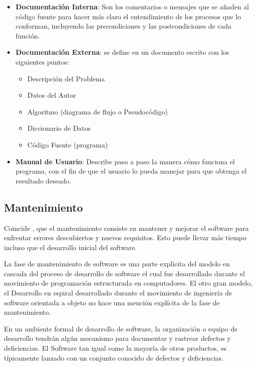 \documentclass[12pt]{article}
\begin{document}
	\begin{itemize}[label=\textbullet, leftmargin=1.27cm]
		\item \textbf{Documentación Interna}: Son los comentarios o mensajes que se añaden al código fuente para hacer más claro el entendimiento de los procesos que lo conforman, incluyendo las precondiciones y las postcondiciones de cada función.
		\item \textbf{Documentación Externa}: se define en un documento escrito con los siguientes puntos:
			\begin{itemize}[label=○]
				\item Descripción del Problema
				\item Datos del Autor
				\item Algoritmo (diagrama de flujo o Pseudocódigo)
				\item Diccionario de Datos
				\item Código Fuente (programa)
			\end{itemize}
		\item \textbf{Manual de Usuario}: Describe paso a paso la manera cómo funciona el programa, con el fin de que el usuario lo pueda manejar para que obtenga el resultado deseado.
	\end{itemize}

	\subsection{Mantenimiento}

	Coincide \textcite{maida_metodologias_2015}, que el mantenimiento consiste en mantener y mejorar el software para enfrentar errores descubiertos y nuevos requisitos. Esto puede llevar más tiempo incluso que el desarrollo inicial del software.

	La fase de mantenimiento de software es una parte explícita del modelo en cascada del proceso de desarrollo de software el cual fue desarrollado durante el movimiento de programación estructurada en computadores. El otro gran modelo, el Desarrollo en espiral desarrollado durante el movimiento de ingeniería de software orientada a objeto no hace una mención explícita de la fase de mantenimiento.

	En un ambiente formal de desarrollo de software, la organización o equipo de desarrollo tendrán algún mecanismo para documentar y rastrear defectos y deficiencias. El Software tan igual como la mayoría de otros productos, es típicamente lanzado con un conjunto conocido de defectos y deficiencias.
\end{document}
